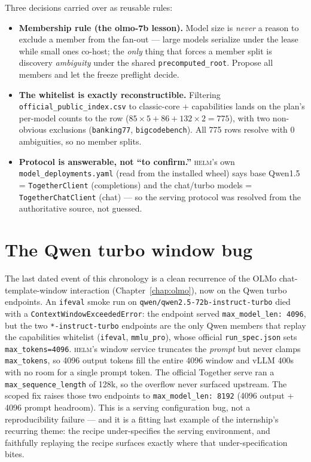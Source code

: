 \documentclass[11pt]{report}
\newcommand{\code}[1]{\texttt{#1}}
\newcommand{\file}[1]{\texttt{#1}}
\begin{document}
Three decisions carried over as reusable rules:

\begin{itemize}[nosep]
  \item \textbf{Membership rule (the olmo-7b lesson).} Model size is \emph{never} a
        reason to exclude a member from the fan-out --- large models serialize under
        the lease while small ones co-host; the \emph{only} thing that forces a
        member split is discovery \emph{ambiguity} under the shared
        \code{precomputed\_root}. Propose all members and let the freeze preflight
        decide.
  \item \textbf{The whitelist is exactly reconstructible.} Filtering
        \code{official\_public\_index.csv} to classic-core + capabilities lands on
        the plan's per-model counts to the row ($85\times5 + 86 + 132\times2 = 775$),
        with two non-obvious exclusions (\code{banking77}, \code{bigcodebench}). All
        775 rows resolve with 0 ambiguities, so no member splits.
  \item \textbf{Protocol is answerable, not ``to confirm.''} \textsc{helm}'s own
        \code{model\_deployments.yaml} (read from the installed wheel) says base
        Qwen1.5 = \code{TogetherClient} (completions) and the chat/turbo models =
        \code{TogetherChatClient} (chat) --- so the serving protocol was resolved
        from the authoritative source, not guessed.
\end{itemize}

\section{The Qwen turbo window bug}
\label{sec:qwenwindow}

The last dated event of this chronology is a clean recurrence of the OLMo
chat-template-window interaction (Chapter~\ref{chap:olmo}), now on the Qwen turbo
endpoints. An \code{ifeval} smoke run on
\code{qwen/qwen2.5-72b-instruct-turbo} died with a
\code{ContextWindowExceededError}: the endpoint served \code{max\_model\_len:
4096}, but the two \code{*-instruct-turbo} endpoints are the only Qwen members that
replay the capabilities whitelist (\code{ifeval}, \code{mmlu\_pro}), whose official
\file{run\_spec.json} sets \code{max\_tokens=4096}. \textsc{helm}'s window service
truncates the \emph{prompt} but never clamps \code{max\_tokens}, so 4096 output
tokens fill the entire 4096 window and vLLM 400s with no room for a single prompt
token. The official Together serve ran a \code{max\_sequence\_length} of 128k, so
the overflow never surfaced upstream. The scoped fix raises those two endpoints to
\code{max\_model\_len: 8192} (4096 output + 4096 prompt headroom). This is a serving
configuration bug, not a reproducibility failure --- and it is a fitting last
example of the internship's recurring theme: the recipe under-specifies the
serving environment, and faithfully replaying the recipe surfaces exactly where
that under-specification bites.
\end{document}
